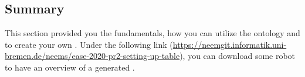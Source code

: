 \subsection{Summary}
	\label{ch:example}
	This section provided you the fundamentals, how you can utilize the \soma ontology and \cram to create your own \neems. Under the following link (\url{https://neemgit.informatik.uni-bremen.de/neems/ease-2020-pr2-setting-up-table}), you can download some robot \neems to have an overview of a generated \neem.
									
%	
%	
